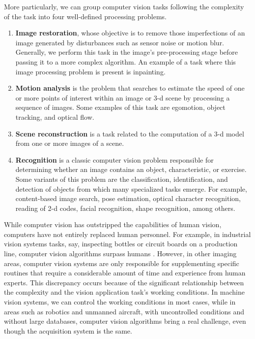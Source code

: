 More particularly, we can group computer vision tasks following the complexity of the task into four well-defined processing problems.

\begin{enumerate}[label=\roman*]
	\item \textbf{Image restoration}, whose objective is to remove those imperfections of an image generated by disturbances such as sensor noise or motion blur. Generally, we perform this task in the image's pre-processing stage before passing it to a more complex algorithm. An example of a task where this image processing problem is present is inpainting.
	\item \textbf{Motion analysis} is the problem that searches to estimate the speed of one or more points of interest within an image or 3-d scene by processing a sequence of images. Some examples of this task are egomotion, object tracking, and optical flow.
	\item \textbf{Scene reconstruction} is a task related to the computation of a 3-d model from one or more images of a scene.
	\item \textbf{Recognition} is a classic computer vision problem responsible for determining whether an image contains an object, characteristic, or exercise. Some variants of this problem are the classification, identification, and detection of objects from which many specialized tasks emerge. For example, content-based image search, pose estimation, optical character recognition, reading of 2-d codes, facial recognition, shape recognition, among others.	
\end{enumerate}

While computer vision has outstripped the capabilities of human vision, computers have not entirely replaced human personnel. For example, in industrial vision systems tasks, say, inspecting bottles or circuit boards on a production line, computer vision algorithms surpass humans \citep{Malamas.Petrakis.ea:IVC:2003}. However, in other imaging areas, computer vision systems are only responsible for supplementing specific routines that require a considerable amount of time and experience from human experts. This discrepancy occurs because of the significant relationship between the complexity and the vision application task's working conditions. In machine vision systems, we can control the working conditions in most cases, while in areas such as robotics and unmanned aircraft, with uncontrolled conditions and without large databases, computer vision algorithms bring a real challenge, even though the acquisition system is the same. 

